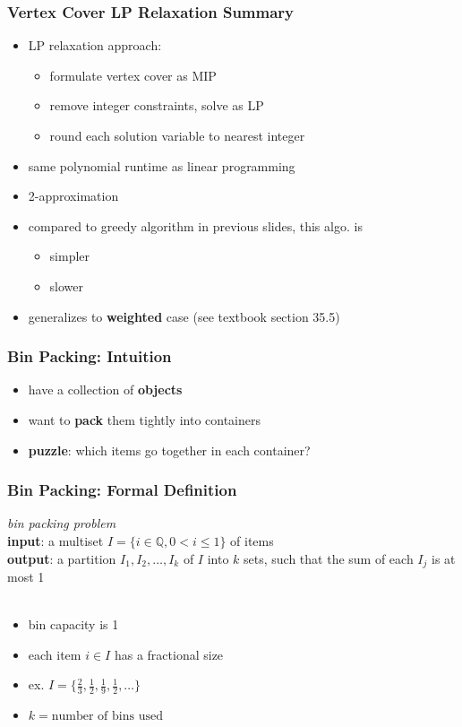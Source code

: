\documentclass{beamer}
\newcommand{\stanza}{ \\~\ }
\begin{document}
\begin{frame} \frametitle{Vertex Cover LP Relaxation Summary}
\begin{itemize}
  \item LP relaxation approach:
    \begin{itemize}
      \item formulate vertex cover as MIP
      \item remove integer constraints, solve as LP
      \item round each solution variable to nearest integer
    \end{itemize}
  \item same polynomial runtime as linear programming
  \item 2-approximation
  \item compared to greedy algorithm in previous slides, this algo. is
  \begin{itemize}
    \item simpler
    \item slower
  \end{itemize}
  \item generalizes to \textbf{weighted} case (see textbook section 35.5)
\end{itemize}
\end{frame}

\begin{frame} \frametitle{Bin Packing: Intuition}
  \begin{itemize}
    \item have a collection of \textbf{objects}
    \item want to \textbf{pack} them tightly into containers
    \item \textbf{puzzle}: which items go together in each container?
  \end{itemize}
\end{frame}

\begin{frame} \frametitle{Bin Packing: Formal Definition}
  \emph{bin packing problem} \\
  \textbf{input}: a multiset $I = \{i \in \mathbb{Q}, 0 < i \leq 1\}$ of items \\
  \textbf{output}: a partition $I_1, I_2, \ldots, I_k$ of $I$ into $k$ sets, such that the sum of each $I_j$ is at most 1
  \stanza

  \begin{itemize}
    \item bin capacity is 1
    \item each item $i \in I$ has a fractional size
    \item ex. $I=\{\frac{2}{3}, \frac{1}{2}, \frac{1}{9}, \frac{1}{2}, \ldots \}$
    \item $k = \text{number of bins used}$
  \end{itemize}
\end{frame}
\end{document}
